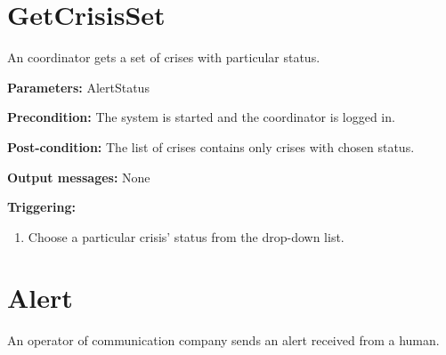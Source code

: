 \section{GetCrisisSet}
\label{operation:GetCrisisSet}

An coordinator gets a set of crises with particular status.

\begin{description}
	\item \textbf{Parameters:} AlertStatus  
	\item \textbf{Precondition:} The system is started and the coordinator is
	logged in.
	\item \textbf{Post-condition:} The list of crises contains only crises with
	chosen status.
	\item \textbf{Output messages:} None
	
	\item \textbf{Triggering:}
	
	\begin{enumerate}
		\item Choose a particular crisis' status from the drop-down list.
	\end{enumerate}
\end{description}

\section{Alert}
\label{operation:Alert}

An operator of communication company sends an alert received from a human.

